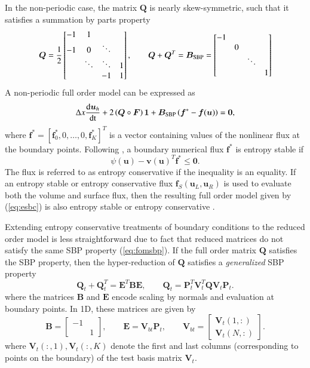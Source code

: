 \documentclass[preprint,10pt]{elsarticle}
\theoremstyle{definition}
\theoremstyle{lemma}
\theoremstyle{theorem}
\theoremstyle{assumption}
\newcommand{\td}[2]{\frac{{\rm d}#1}{{\rm d}{\rm #2}}}
\newcommand{\LRp}[1]{\left( #1 \right)}
\newcommand{\LRs}[1]{\left[ #1 \right]}
\begin{document}
In the non-periodic case, the matrix $\bm{Q}$ is nearly skew-symmetric, such that it satisfies a summation by parts property
\begin{equation}
\bm{Q} = \frac{1}{2}\begin{bmatrix}
-1 & 1 & & \\
-1 & 0 & \ddots &\\
 &\ddots &\ddots &1\\
  & & -1 &1\\
\end{bmatrix}, \qquad \bm{Q} + \bm{Q}^T = \bm{B}_{\rm SBP} = 
\begin{bmatrix}
-1& && \\
&0 &&\\
& &\ddots &\\
& &&1\\
\end{bmatrix}
\label{eq:fomsbp}
\end{equation}
A non-periodic full order model can be expressed as 
\begin{align}
\Delta x \td{\bm{u}_h}{t} + 2\LRp{{\bm{Q}}\circ \bm{F}}\bm{1} + \bm{B}_{\rm SBP}\LRp{\bm{f}^* - \bm{f}(\bm{u})} = \bm{0},
\label{eq:esbc}
\end{align}
where $\bm{f}^* = \LRs{\bm{f}^*_0, 0,\ldots, 0, \bm{f}^*_K}^T$ is a vector containing values of the nonlinear flux at the boundary points.  
Following \cite{chen2017entropy}, a boundary numerical flux $\bm{f}^*$ is entropy stable if 
\begin{equation}
\psi\LRp{\bm{u}} - \bm{v}(\bm{u})^T\bm{f}^* \leq \bm{0}.%
\label{eq:esbflux}
\end{equation}
The flux is referred to as entropy conservative if the inequality is an equality.  If an entropy stable or entropy conservative flux $\bm{f}_S(\bm{u}_L,\bm{u}_R)$ is used to evaluate both the volume and surface flux, then the resulting full order model given by (\ref{eq:esbc}) is also entropy stable or entropy conservative \cite{tadmor1987numerical, parsani2015entropy, chen2017entropy}.  

Extending entropy conservative treatments of boundary conditions to the reduced order model is less straightforward due to fact that reduced matrices do not satisfy the same SBP property (\ref{eq:fomsbp}).  If the full order matrix $\bm{Q}$ satisfies the SBP property, then the hyper-reduction of $\bm{Q}$ satisfies a \textit{generalized} SBP property \cite{fernandez2014generalized} 
\[
\bm{Q}_t + \bm{Q}_t^T = \bm{E}^T\bm{B}\bm{E}, \qquad \bm{Q}_t = \bm{P}_t^T\bm{V}_t^T\bm{Q}\bm{V}_t\bm{P}_t.
\]
where the matrices $\bm{B}$ and $\bm{E}$ encode scaling by normals and evaluation at boundary points.  In 1D, these matrices are given by
\[
\bm{B} = \begin{bmatrix}-1 & \\ & 1\end{bmatrix}, \qquad \bm{E} = \bm{V}_{bt}\bm{P}_t, \qquad \bm{V}_{bt} = \begin{bmatrix}\bm{V}_t(1,:) \\ \bm{V}_t(N,:)\end{bmatrix}.
\]
where $\bm{V}_t(:,1), \bm{V}_t(:,K)$ denote the first and last columns (corresponding to points on the boundary) of the test basis matrix $\bm{V}_t$.  
\end{document}
